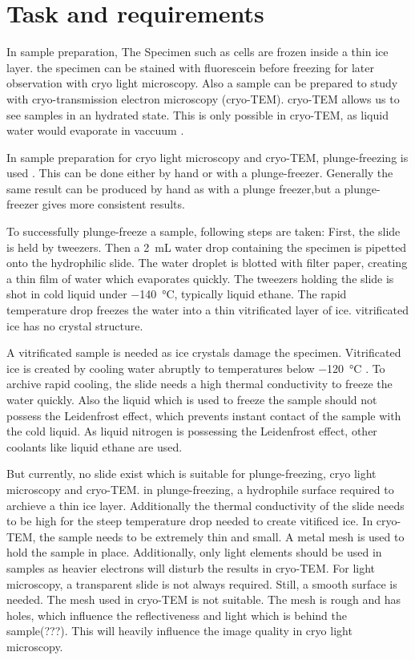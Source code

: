 \section{Task and requirements}

In sample preparation, The Specimen such as cells are frozen inside a thin ice layer. the specimen can be stained with fluorescein before freezing for later observation with cryo light microscopy. Also a sample can be prepared to study with cryo-transmission electron microscopy (cryo-TEM). cryo-TEM allows us to see samples in an hydrated state. This is only possible in cryo-TEM, as liquid water would evaporate in vaccuum \cite{Danino.2012}.

In sample preparation for cryo light microscopy and cryo-TEM, plunge-freezing is used \cite{Danino.2012} \cite{Faoro.2018}. This can be done either by hand or with a plunge-freezer.
Generally the same result can be produced by hand as with a plunge freezer,but a plunge-freezer gives more consistent results. 

To successfully plunge-freeze a sample, following steps are taken: First, the slide is held by tweezers. Then a \SI{2}{\milli\liter} water drop containing the specimen is pipetted onto the hydrophilic slide. The water droplet is blotted with filter paper, creating a thin film of water which evaporates quickly. The tweezers holding the slide is shot in cold liquid under \SI{-140}{\degreeCelsius}, typically liquid ethane. The rapid temperature drop freezes the water into a thin vitrificated layer of ice. vitrificated ice has no crystal structure.

A vitrificated sample is needed as ice crystals damage the specimen. Vitrificated ice is created by cooling water abruptly to temperatures below \SI{-120}{\degreeCelsius} \cite{Wowk.2010}. To archive rapid cooling, the slide needs a high thermal conductivity to freeze the water quickly. Also the liquid which is used to freeze the sample should not possess the Leidenfrost effect, which prevents instant contact of the sample with the cold liquid. As liquid nitrogen is possessing the Leidenfrost effect, other coolants like liquid ethane are used.

But currently, no slide exist which is suitable for plunge-freezing, cryo light microscopy and cryo-TEM. in plunge-freezing, a hydrophile surface required to archieve a thin ice layer. Additionally the thermal conductivity of the slide needs to be high for the steep temperature drop needed to create vitificed ice. In cryo-TEM, the sample needs to be extremely thin and small. A metal mesh is used to hold the sample in place. Additionally, only light elements should be used in samples as heavier electrons will disturb the results in cryo-TEM. For light microscopy, a transparent slide is not always required. Still, a smooth surface is needed. The mesh used in cryo-TEM is not suitable. The mesh is rough and has holes, which influence the reflectiveness and light which is behind the sample(???). This will heavily influence the image quality in cryo light microscopy.
 
